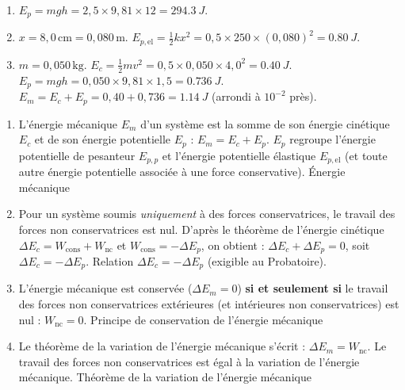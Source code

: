\documentclass[11pt]{article}
\newcommand{\cle}[1]{{\popxbold\color{popdark}#1}}
\begin{document}
\begin{corrige}
\begin{enumerate}
    \item $E_p = mgh = 2,5 \times 9,81 \times 12 = \SI{294,3}{J}$.
    \item $x = 8,0\,\text{cm} = 0,080\,\text{m}$. $E_{p,\text{el}} = \frac{1}{2}k x^2 = 0,5 \times 250 \times (0,080)^2 = \SI{0,80}{J}$.
    \item $m = 0,050\,\text{kg}$.
    $E_c = \frac{1}{2}mv^2 = 0,5 \times 0,050 \times 4,0^2 = \SI{0,40}{J}$.
    $E_p = mgh = 0,050 \times 9,81 \times 1,5 = \SI{0,736}{J}$.
    $E_m = E_c + E_p = 0,40 + 0,736 = \SI{1,14}{J}$ (arrondi à $10^{-2}$ près).
\end{enumerate}
\end{corrige}

\begin{corrige}
\begin{enumerate}
    \item L'énergie mécanique $E_m$ d'un système est la somme de son énergie cinétique $E_c$ et de son énergie potentielle $E_p$ : $E_m = E_c + E_p$. $E_p$ regroupe l'énergie potentielle de pesanteur $E_{p,p}$ et l'énergie potentielle élastique $E_{p,\text{el}}$ (et toute autre énergie potentielle associée à une force conservative). \cle{Énergie mécanique}
    \item Pour un système soumis \emph{uniquement} à des forces conservatrices, le travail des forces non conservatrices est nul. D'après le théorème de l'énergie cinétique $\Delta E_c = W_{\text{cons}} + W_{\text{nc}}$ et $W_{\text{cons}} = -\Delta E_p$, on obtient : $\Delta E_c + \Delta E_p = 0$, soit $\Delta E_c = -\Delta E_p$. \cle{Relation $\Delta E_c = -\Delta E_p$} (exigible au Probatoire).
    \item L'énergie mécanique est conservée ($\Delta E_m = 0$) \textbf{si et seulement si} le travail des forces non conservatrices extérieures (et intérieures non conservatrices) est nul : $W_{\text{nc}} = 0$. \cle{Principe de conservation de l'énergie mécanique}
    \item Le théorème de la variation de l'énergie mécanique s'écrit : $\Delta E_m = W_{\text{nc}}$. Le travail des forces non conservatrices est égal à la variation de l'énergie mécanique. \cle{Théorème de la variation de l'énergie mécanique}
\end{enumerate}
\end{corrige}
\end{document}
